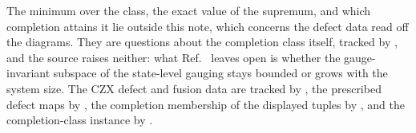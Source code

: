 \documentclass{article}
\begin{document}
The minimum over the class, the exact value of the supremum, and which
completion attains it lie outside this note, which concerns the defect data
read off the diagrams. They are questions about the completion class itself,
tracked by , and the source raises neither: what
Ref.~\cite[lines~5198--5204]{FrancoRubio2025MPUGauging} leaves open is whether
the gauge-invariant subspace of the state-level gauging stays bounded or grows
with the system size. The CZX defect and fusion data are tracked by
, the prescribed defect maps by , the completion
membership of the displayed tuples by , and the completion-class
instance by .



\end{document}
